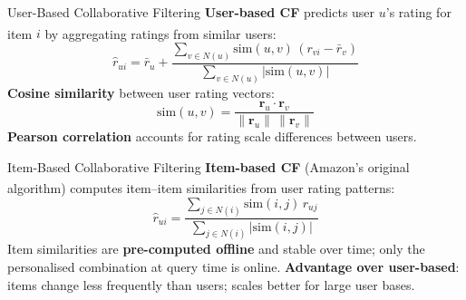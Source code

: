 \begin{v3topic}{User-Based Collaborative Filtering}
    \textbf{User-based CF} predicts user $u$'s rating for item $i$ by aggregating ratings from similar users\textsuperscript{\cite[][pp.~31--36]{aggarwalRecommenderSystems2016}}:
    \begin{equation}
        \hat{r}_{ui} = \bar{r}_u + \frac{\sum_{v \in N(u)} \text{sim}(u,v)\,(r_{vi} - \bar{r}_v)}{\sum_{v \in N(u)} |\text{sim}(u,v)|}
    \end{equation}
    \textbf{Cosine similarity} between user rating vectors:
    \begin{equation}
        \text{sim}(u,v) = \frac{\mathbf{r}_u \cdot \mathbf{r}_v}{\|\mathbf{r}_u\|\,\|\mathbf{r}_v\|}
    \end{equation}
    \textbf{Pearson correlation} accounts for rating scale differences between users.

\end{v3topic}
\begin{v3topic}{Item-Based Collaborative Filtering}
    \textbf{Item-based CF} (Amazon's original algorithm) computes item--item similarities from user rating patterns\textsuperscript{\cite[][pp.~38--42]{aggarwalRecommenderSystems2016}}:
    \begin{equation}
        \hat{r}_{ui} = \frac{\sum_{j \in N(i)} \text{sim}(i,j)\,r_{uj}}{\sum_{j \in N(i)} |\text{sim}(i,j)|}
    \end{equation}
    Item similarities are \textbf{pre-computed offline} and stable over time; only the personalised combination at query time is online.
    \textbf{Advantage over user-based}: items change less frequently than users; scales better for large user bases.

\end{v3topic}
